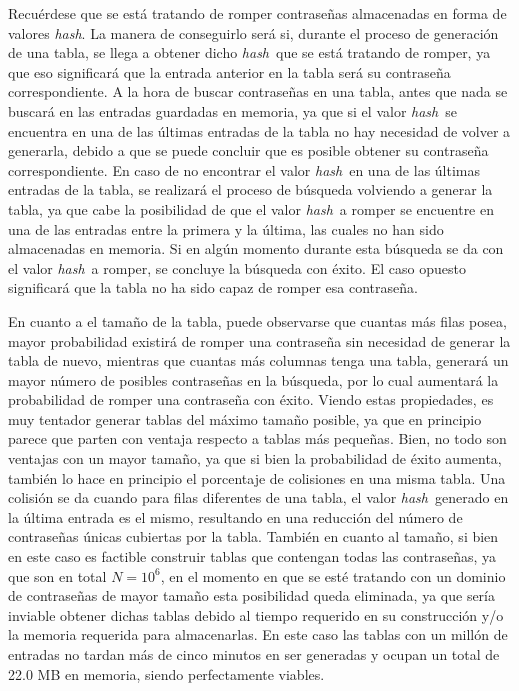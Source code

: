 \documentclass[12pt,spanish,listoffigures,listoftables]{tfgetsinf}
\newcommand{\hash}{\textit{hash}}
\begin{document}
Recuérdese que se está tratando de romper contraseñas almacenadas en forma de valores \hash. La manera de conseguirlo será si, durante el proceso de generación de una tabla, se llega a obtener dicho \hash~que se está tratando de romper, ya que eso significará que la entrada anterior en la tabla será su contraseña correspondiente. A la hora de buscar contraseñas en una tabla, antes que nada se buscará en las entradas guardadas en memoria, ya que si el valor \hash~se encuentra en una de las últimas entradas de la tabla no hay necesidad de volver a generarla, debido a que se puede concluir que es posible obtener su contraseña correspondiente. En caso de no encontrar el valor \hash~en una de las últimas entradas de la tabla, se realizará el proceso de búsqueda volviendo a generar la tabla, ya que cabe la posibilidad de que el valor \hash~a romper se encuentre en una de las entradas entre la primera y la última, las cuales no han sido almacenadas en memoria. Si en algún momento durante esta búsqueda se da con el valor \hash~a romper, se concluye la búsqueda con éxito. El caso opuesto significará que la tabla no ha sido capaz de romper esa contraseña.

En cuanto a el tamaño de la tabla, puede observarse que cuantas más filas posea, mayor probabilidad existirá de romper una contraseña sin necesidad de generar la tabla de nuevo, mientras que cuantas más columnas tenga una tabla, generará un mayor número de posibles contraseñas en la búsqueda, por lo cual aumentará la probabilidad de romper una contraseña con éxito. Viendo estas propiedades, es muy tentador generar tablas del máximo tamaño posible, ya que en principio parece que parten con ventaja respecto a tablas más pequeñas. Bien, no todo son ventajas con un mayor tamaño, ya que si bien la probabilidad de éxito aumenta, también lo hace en principio el porcentaje de colisiones en una misma tabla. Una colisión se da cuando para filas diferentes de una tabla, el valor \hash~generado en la última entrada es el mismo, resultando en una reducción del número de contraseñas únicas cubiertas por la tabla. También en cuanto al tamaño, si bien en este caso es factible construir tablas que contengan todas las contraseñas, ya que son en total $N = 10^6$, en el momento en que se esté tratando con un dominio de contraseñas de mayor tamaño esta posibilidad queda eliminada, ya que sería inviable obtener dichas tablas debido al tiempo requerido en su construcción y/o la memoria requerida para almacenarlas. En este caso las tablas con un millón de entradas no tardan más de cinco minutos en ser generadas y ocupan un total de 22.0 MB en memoria, siendo perfectamente viables.
\end{document}

